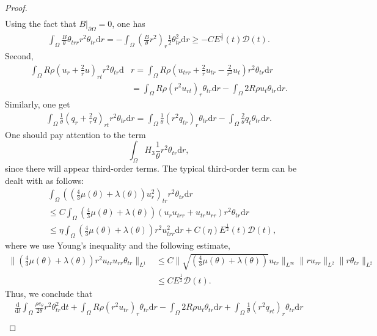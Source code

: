 \documentclass[11pt,reqno]{amsart}
\numberwithin{equation}{section}
\newcommand{\dif}{\mathrm{d}}
\begin{document}
\begin{proof}
\begin{align*}
 \end{align*}
 Using the fact that $B|_{\partial \Omega}=0$, one has
 \begin{align*}
 \int_{\Omega} \frac{B}{\theta} \theta_{trr} r^2 \theta_{tr} \dif r =-\int_{\Omega} \left(\frac{B}{\theta} r^2\right)_r \frac{1}{2}\theta_{tr}^2 \dif r \ge -C E^\frac{1}{2}(t) \mathcal D(t).
 \end{align*}
 Second,
 \begin{align*}
 \int_{\Omega}  R \rho \left(u_r+\frac{2}{r}u\right)_{rt} r^2 \theta_{tr}\dif &r=\int_{\Omega} R \rho \left( u_{trr}+\frac{2}{r}u_{tr}-\frac{2}{r^2} u_t\right) r^2 \theta_{tr} \dif r\\
 &=\int_{\Omega} R \rho (r^2 u_{rt})_r \theta_{tr} \dif r-\int_{\Omega} 2 R \rho  u_t \theta_{tr}\dif r.
 \end{align*}
 Similarly, one get
 \begin{align*}
 \int_{\Omega} \frac{1}{\theta} \left(q_r+\frac{2}{r}q\right)_{rt} r^2 \theta_{tr}\dif r =\int_{\Omega} \frac{1}{\theta} (r^2 q_{tr})_r \theta_{tr}\dif r-\int_{\Omega} \frac{2}{\theta} q_t \theta_{tr}\dif r.
 \end{align*}
 One should pay attention to the term
 \[
  \int_{\Omega} H_3 \frac{1}{\theta} r^2 \theta_{tr} \dif r,
  \] since there will appear third-order terms. The typical  third-order term can be dealt with as follows:
  \begin{align*}
 & \int_{\Omega} \left(\left(\frac{4}{3}\mu(\theta)+\lambda(\theta)\right) u_r^2\right)_{tr} r^2 \theta_{tr} \dif r\\
&  \le C\int_{\Omega} \left(\frac{4}{3}\mu(\theta)+\lambda(\theta)\right) (u_r u_{trr}+u_{tr} u_{rr}) r^2 \theta_{tr}\dif r\\
 & \le \eta \int_{\Omega} \left(\frac{4}{3}\mu(\theta)+\lambda(\theta)\right) r^2u_{trr}^2 \dif r+ C(\eta) E^\frac{1}{2}(t) \mathcal D(t),
  \end{align*}
  where we use Young's inequality and the following estimate,
  \begin{align*}
  \| \left(\frac{4}{3}\mu(\theta)+\lambda(\theta)\right)  r^2u_{tr} u_{rr} \theta_{tr}\|_{L^1}&\le C \| \sqrt{\left(\frac{4}{3}\mu(\theta)+\lambda(\theta)\right) } u_{tr}\|_{L^\infty} \|ru_{rr}\|_{L^2} \|r\theta_{tr}\|_{L^2} \\
  &\le C E^\frac{1}{2} \mathcal D(t).
  \end{align*}
 Thus, we conclude that
 \begin{align}
 \frac{\dif}{\dif t} \int_{\Omega} \frac{\rho e_\theta}{2\theta} r^2 \theta_{tr}^2 \dif t+\int_{\Omega} R \rho (r^2 u_{tr})_r \theta_{tr} \dif r-\int_{\Omega} 2 R\rho u_t \theta_{tr} \dif r +\int_{\Omega} \frac{1}{\theta} (r^2 q_{rt})_r\theta_{tr}\dif r \nonumber\\

\end{align}
\end{proof}
\end{document}
